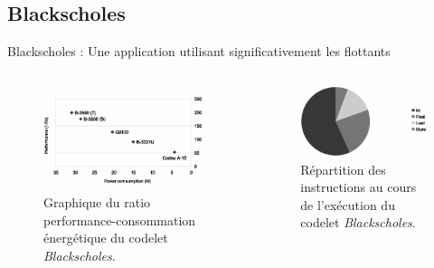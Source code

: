 \documentclass{beamer}
\begin{document}
\subsection{Blackscholes}
\begin{frame}{Blackscholes : Une application utilisant significativement les flottants}

\begin{columns}

\begin{column}{0.4\paperwidth}
\begin{figure}
\centering
\includegraphics[width=\textwidth]{Blackscholes.eps}
\caption{\label{Blackscholes}Graphique du ratio performance-consommation énergétique du codelet \textit{Blackscholes}.}
\end{figure}
\end{column}

\begin{column}{0.4\paperwidth}
\begin{figure}
\centering
\includegraphics[width=\textwidth]{Blackscholes_instr.eps}
\caption{\label{Blackscholes_instr}Répartition des instructions au cours de l'exécution du codelet \textit{Blackscholes}.}
\end{figure}
\end{column}

\end{columns}

\end{frame}
\end{document}
